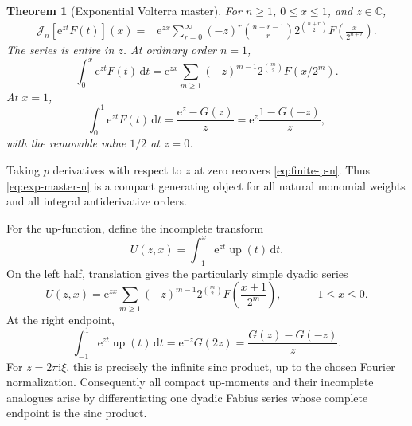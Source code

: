 \documentclass[11pt,oneside]{article}
\newtheorem{theorem}{Theorem}[section]
\theoremstyle{definition}
\theoremstyle{remark}
\newcommand{\Up}{\operatorname{up}}
\newcommand{\C}{\mathbb C}
\newcommand{\dd}{\,\mathrm d}
\newcommand{\e}{\mathrm e}
\newcommand{\ii}{\mathrm i}
\newcommand{\Jn}{\mathcal J}
\newcommand{\1}{\mathbf 1}
\begin{document}
\begin{theorem}[Exponential Volterra master]\label{thm:exp-master}
For \(n\geq1\), \(0\leq x\leq1\), and \(z\in\C\),
\begin{equation}
 \boxed{\begin{aligned}
 \Jn_n[\e^{zt}F(t)](x)
 ={}&\e^{zx}\sum_{r=0}^{\infty}(-z)^r\binom{n+r-1}{r}
 2^{\binom{n+r}{2}}F\!\left(\frac{x}{2^{n+r}}\right).
 \end{aligned}}                                                \label{eq:exp-master-n}
\end{equation}
The series is entire in \(z\).  At ordinary order \(n=1\),
\begin{equation}
 \int_0^x\e^{zt}F(t)\dd t
 =\e^{zx}\sum_{m\geq1}(-z)^{m-1}2^{\binom m2}F(x/2^m).         \label{eq:exp-master-one}
\end{equation}
At \(x=1\),
\begin{equation}
 \boxed{\quad
 \int_0^1\e^{zt}F(t)\dd t
 =\frac{\e^z-G(z)}{z}
 =\e^z\frac{1-G(-z)}{z},
 \quad}                                                        \label{eq:exp-definite}
\end{equation}
with the removable value \(1/2\) at \(z=0\).
\end{theorem}

Taking \(p\) derivatives with respect to \(z\) at zero recovers
\eqref{eq:finite-p-n}.  Thus \eqref{eq:exp-master-n} is a compact generating
object for all natural monomial weights and all integral antiderivative orders.

For the up-function, define the incomplete transform
\begin{equation}
 U(z,x)=\int_{-1}^x\e^{zt}\Up(t)\dd t.                          \label{eq:U-zx}
\end{equation}
On the left half, translation gives the particularly simple dyadic series
\begin{equation}
 U(z,x)=\e^{zx}\sum_{m\geq1}(-z)^{m-1}2^{\binom m2}
 F\!\left(\frac{x+1}{2^m}\right),\qquad -1\leq x\leq0.        \label{eq:U-left-exp}
\end{equation}
At the right endpoint,
\begin{equation}
 \int_{-1}^1\e^{zt}\Up(t)\dd t
 =\e^{-z}G(2z)=\frac{G(z)-G(-z)}{z}.                            \label{eq:up-mgf}
\end{equation}
For \(z=2\pi\ii\xi\), this is precisely the infinite sinc product, up to the
chosen Fourier normalization.  Consequently all compact up-moments and their
incomplete analogues arise by differentiating one dyadic Fabius series whose
complete endpoint is the sinc product.
\end{document}

